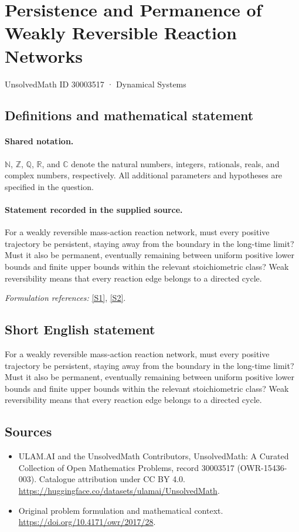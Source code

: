 \documentclass[11pt]{article}
\newcommand{\sref}[2]{\hyperlink{source:#1:#2}{[S#2]}}
\begin{document}
\setcounter{section}{30003516}
\section{Persistence and Permanence of Weakly Reversible Reaction Networks}\label{30003517}
{\small UnsolvedMath ID 30003517 · Dynamical Systems}
\subsection{Definitions and mathematical statement}

\paragraph{Shared notation.}$\mathbb N$, $\mathbb Z$, $\mathbb Q$, $\mathbb R$, and $\mathbb C$ denote the natural numbers, integers, rationals, reals, and complex numbers, respectively. All additional parameters and hypotheses are specified in the question.


\paragraph{Statement recorded in the supplied source.}
For a weakly reversible mass-action reaction network, must every positive trajectory be persistent, staying away from the boundary in the long-time limit? Must it also be permanent, eventually remaining between uniform positive lower bounds and finite upper bounds within the relevant stoichiometric class? Weak reversibility means that every reaction edge belongs to a directed cycle.
\par\smallskip\textit{Formulation references:} \sref{30003517}{1}, \sref{30003517}{2}.
\subsection{Short English statement}
For a weakly reversible mass-action reaction network, must every positive trajectory be persistent, staying away from the boundary in the long-time limit? Must it also be permanent, eventually remaining between uniform positive lower bounds and finite upper bounds within the relevant stoichiometric class? Weak reversibility means that every reaction edge belongs to a directed cycle.
\subsection{Sources}
\begin{itemize}
\item[\hypertarget{source:30003517:1}{S1}] ULAM.AI and the UnsolvedMath Contributors, UnsolvedMath: A Curated Collection of Open Mathematics Problems, record 30003517 (OWR-15436-003). Catalogue attribution under CC BY 4.0.
\url{https://huggingface.co/datasets/ulamai/UnsolvedMath}.
\item[\hypertarget{source:30003517:2}{S2}] Original problem formulation and mathematical context.
\url{https://doi.org/10.4171/owr/2017/28}.
\end{itemize}
\label{end:30003517}
\end{document}
